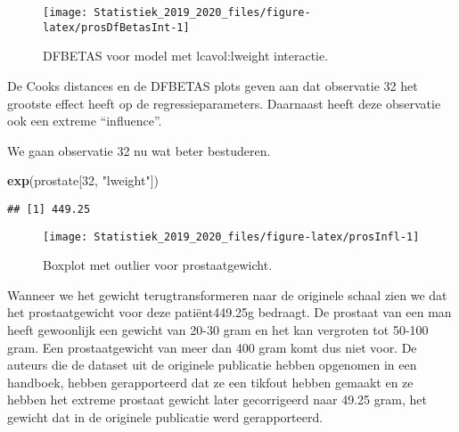 \documentclass[12pt,dutch,coursenotes]{book}
\newenvironment{Shaded}{\begin{snugshade}}{\end{snugshade}}
\newcommand{\KeywordTok}[1]{\textcolor[rgb]{0.13,0.29,0.53}{\textbf{#1}}}
\newcommand{\DataTypeTok}[1]{\textcolor[rgb]{0.13,0.29,0.53}{#1}}
\newcommand{\DecValTok}[1]{\textcolor[rgb]{0.00,0.00,0.81}{#1}}
\newcommand{\StringTok}[1]{\textcolor[rgb]{0.31,0.60,0.02}{#1}}
\newcommand{\OperatorTok}[1]{\textcolor[rgb]{0.81,0.36,0.00}{\textbf{#1}}}
\newcommand{\NormalTok}[1]{#1}
\theoremstyle{definition}
\theoremstyle{definition}
\theoremstyle{definition}
\theoremstyle{remark}
\begin{document}
\begin{figure}

{\centering \texttt{[image: Statistiek\_2019\_2020\_files/figure-latex/prosDfBetasInt-1]} 

}

\caption{DFBETAS voor model met lcavol:lweight interactie.}\label{fig:prosDfBetasInt}
\end{figure}

De Cooks distances en de DFBETAS plots geven aan dat observatie 32 het
grootste effect heeft op de regressieparameters. Daarnaast heeft deze
observatie ook een extreme ``influence''.

We gaan observatie 32 nu wat beter bestuderen.

\begin{Shaded}
\begin{Highlighting}[]
\KeywordTok{exp}\NormalTok{(prostate[}\DecValTok{32}\NormalTok{, }\StringTok{"lweight"}\NormalTok{])}
\end{Highlighting}
\end{Shaded}

\begin{verbatim}
## [1] 449.25
\end{verbatim}

\begin{Shaded}
\end{Shaded}

\begin{figure}

{\centering \texttt{[image: Statistiek\_2019\_2020\_files/figure-latex/prosInfl-1]} 

}

\caption{Boxplot met outlier voor prostaatgewicht.}\label{fig:prosInfl}
\end{figure}

Wanneer we het gewicht terugtransformeren naar de originele schaal zien
we dat het prostaatgewicht voor deze patiënt449.25g bedraagt. De
prostaat van een man heeft gewoonlijk een gewicht van 20-30 gram en het
kan vergroten tot 50-100 gram. Een prostaatgewicht van meer dan 400 gram
komt dus niet voor. De auteurs die de dataset uit de originele
publicatie hebben opgenomen in een handboek, hebben gerapporteerd dat ze
een tikfout hebben gemaakt en ze hebben het extreme prostaat gewicht
later gecorrigeerd naar 49.25 gram, het gewicht dat in de originele
publicatie werd gerapporteerd.
\end{document}
